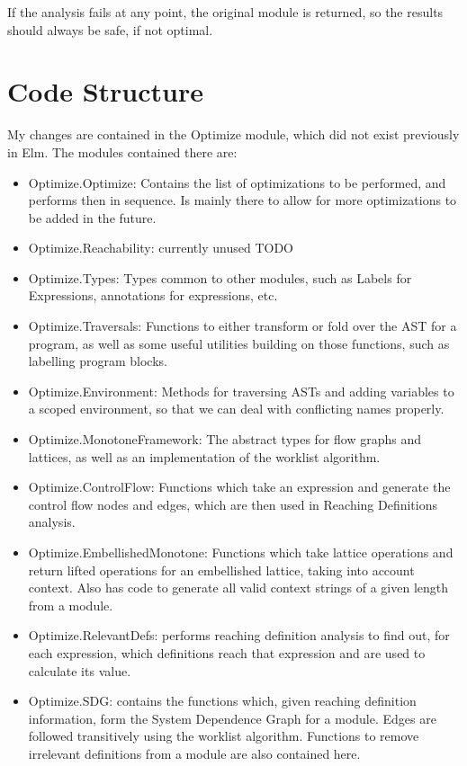 \documentclass{article}
\begin{document}
If the analysis fails at any point, the original module is returned, so the results should always be safe, if not optimal.

\section{Code Structure}

My changes are contained in the Optimize module, which did not exist previously in Elm. The modules contained there are:

\begin{itemize}
\item
  Optimize.Optimize: Contains the list of optimizations to be performed, and performs then in sequence. Is mainly there to allow for more optimizations to be added in the future.
\item
  Optimize.Reachability: currently unused TODO
\item
  Optimize.Types: Types common to other modules, such as Labels for Expressions, annotations for expressions, etc.
\item
  Optimize.Traversals: Functions to either transform or fold over the AST for a program, as well as some useful utilities building on those functions, such as labelling program blocks.
\item
  Optimize.Environment: Methods for traversing ASTs and adding variables to a scoped environment, so that we can deal with conflicting names properly.
\item
  Optimize.MonotoneFramework: The abstract types for flow graphs and lattices, as well as an implementation of the worklist algorithm.
\item
  Optimize.ControlFlow: Functions which take an expression and generate the control flow nodes and edges, which are then used in Reaching Definitions analysis.
\item
  Optimize.EmbellishedMonotone: Functions which take lattice operations and return lifted operations for an embellished lattice, taking into account context. Also has code to generate all valid context strings of a given length from a module.
\item
  Optimize.RelevantDefs: performs reaching definition analysis to find out, for each expression, which definitions reach that expression and are used to calculate its value.
\item
  Optimize.SDG: contains the functions which, given reaching definition information, form the System Dependence Graph for a module. Edges are followed transitively using the worklist algorithm. Functions to remove irrelevant definitions from a module are also contained here.
\end{itemize}
\end{document}

